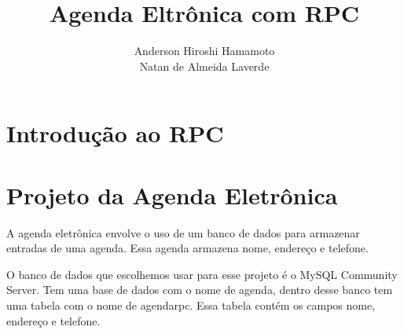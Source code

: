\documentclass[12pt,a4paper]{article}
\author{Anderson Hiroshi Hamamoto \\ Natan de Almeida Laverde}
\date{}
\title{Agenda Eltrônica com RPC}
\begin{document}
\maketitle

\section{Introdução ao RPC}

\section{Projeto da Agenda Eletrônica}

A agenda eletrônica envolve o uso de um banco de dados para armazenar entradas de
uma agenda. Essa agenda armazena nome, endereço e telefone.

O banco de dados que escolhemos usar para esse projeto é o MySQL Community Server\cite{mysql}.
Tem uma base de dados com o nome de agenda, dentro desse banco tem uma tabela com o nome de
agendarpc. Essa tabela contém os campos nome, endereço e telefone.



\end{document}
